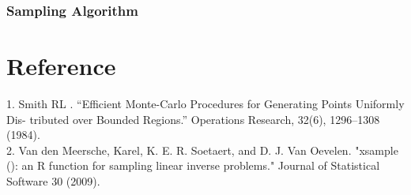 \documentclass[11 pt, a4paper]{article}  %
\begin{document}
\subsubsection{Sampling Algorithm}

%





\newpage
\section*{Reference}
1. Smith RL . “Efficient Monte-Carlo Procedures for Generating Points Uniformly Dis- tributed over Bounded Regions.” Operations Research, 32(6), 1296–1308 (1984).\\ 
2. Van den Meersche, Karel, K. E. R. Soetaert, and D. J. Van Oevelen. "xsample (): an R function for sampling linear inverse problems." Journal of Statistical Software 30 (2009).
\end{document}
